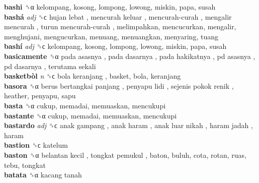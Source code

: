 \textbf{bashi} ␝α  kelompang, kosong, lompong, lowong, miskin, papa, susah  \\
\textbf{bashá} \emph{adj}  ␝ϲ   hujan lebat ,  mencurah keluar ,  mencurah-curah ,  mengalir mencurah ,  turun mencurah-curah , melimpahkan, mencucurkan, mengalir, menghujani, mengucurkan, menuang, menuangkan, menyaring, tuang  \\
\textbf{bashí} \emph{adj}  ␝ϲ  kelompang, kosong, lompong, lowong, miskin, papa, susah  \\
\textbf{basicamente} ␝α   pada asasnya ,  pada dasarnya ,  pada hakikatnya ,  pd asasnya ,  pd dasarnya ,  terutama sekali   \\
\textbf{basketbòl} \emph{n}  ␝ϲ   bola keranjang , basket, bola, keranjang  \\
\textbf{basora} ␝α   berus bertangkai panjang ,  penyapu lidi ,  sejenis pokok renik , heather, penyapu, sapu  \\
\textbf{basta} ␝α  cukup, memadai, memuaskan, mencukupi  \\
\textbf{bastante} ␝α  cukup, memadai, memuaskan, mencukupi  \\
\textbf{bastardo} \emph{adj}  ␝ϲ   anak gampang ,  anak haram ,  anak luar nikah ,  haram jadah , haram  \\
\textbf{bastion} ␝ϲ  katelum  \\
\textbf{baston} ␝α   belantan kecil ,  tongkat pemukul , baton, buluh, cota, rotan, ruas, tebu, tongkat  \\
\textbf{batata} ␝α   kacang tanah   \\
